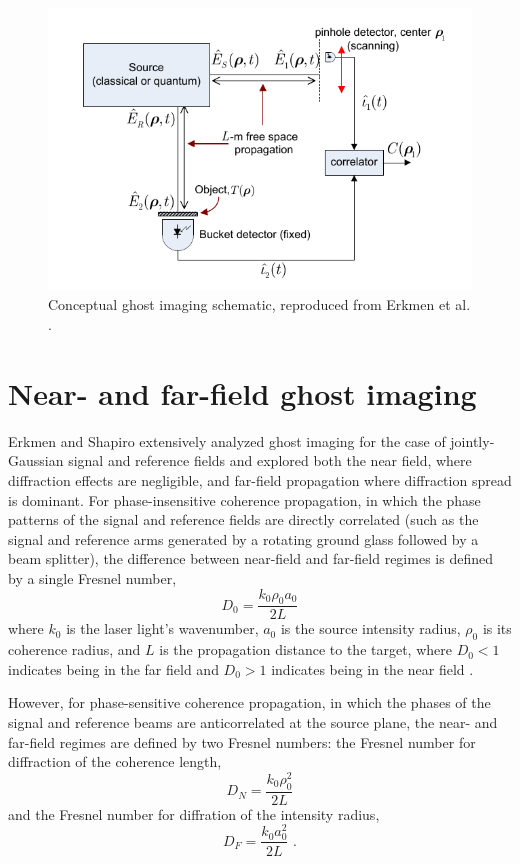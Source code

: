 \begin{figure}[htb]
\centerline{\includegraphics[width=12cm]{figure-ghost-schematic.pdf}}
\caption{Conceptual ghost imaging schematic, reproduced from Erkmen et al. \cite{erkmen-unified}.}
\label{figure:ghost-schematic}
\end{figure}

\section{Near- and far-field ghost imaging}

Erkmen and Shapiro extensively analyzed ghost imaging for the case of jointly-Gaussian signal and reference fields and explored both the near field, where diffraction effects are negligible, and far-field propagation where diffraction spread is dominant. For phase-insensitive coherence propagation, in which the phase patterns of the signal and reference fields are directly correlated (such as the signal and reference arms generated by a rotating ground glass followed by a beam splitter), the difference between near-field and far-field regimes is defined by a single Fresnel number,
\begin{equation}
D_0 = \frac{k_0 \rho_0 a_0}{2L}
\end{equation}
where $k_0$ is the laser light's wavenumber, $a_0$ is the source intensity radius, $\rho_0$ is its coherence radius, and $L$ is the propagation distance to the target, where $D_0 < 1$ indicates being in the far field and $D_0 > 1$ indicates being in the near field \cite{erkmen-unified}.

However, for phase-sensitive coherence propagation, in which the phases of the signal and reference beams are anticorrelated at the source plane, the near- and far-field regimes are defined by two Fresnel numbers: the Fresnel number for diffraction of the coherence length,
\begin{equation}
D_N = \frac{k_0\rho_0^2}{2L}
\end{equation}
and the Fresnel number for diffration of the intensity radius,
\begin{equation}
D_F = \frac{k_0 a_0^2}{2L}\,\,.
\end{equation}

